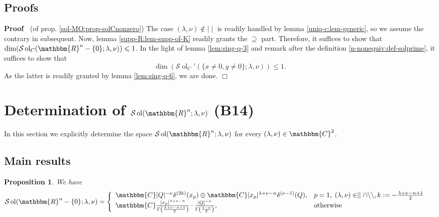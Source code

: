 \documentclass{article}
\newcommand{\nin}{\not\in}
\newcommand{\tmop}[1]{\ensuremath{\operatorname{#1}}}
\renewenvironment{proof}{\noindent\textbf{Proof\ }}{\hspace*{\fill}$\Box$\medskip}
\newtheorem{proposition}{Proposition}[section]
\theoremstyle{remark}
\begin{document}
\subsection{Proofs}

\begin{proof}
  (of prop. \ref{sol-MO:prop-solCnonzero}) The case $(\lambda, \nu) \nin \mid
  \mid$ is readily handled by lemma \ref{uniq-c:lem-generic}, so we assume the
  contrary in subsequent. Now, lemma \ref{supp-R:lem-supp-of-K} readily grants
  the $\supseteq$ part. Therefore, it suffices to show that $\dim (\mathcal{S}
  \tmop{ol}_C (\mathbbm{R}^n - \{ 0 \} ; \lambda, \nu)) \leqslant 1$. In the
  light of lemma \ref{lem:sing-q-3} and remark after the definition
  \ref{n-nonequiv:def-solprime}, it suffices to show that
  \[ \dim (\mathcal{S} \tmop{ol}_C' (\{ x \neq 0, y \neq 0 \} ; \lambda,
     \nu)) \leqslant 1. \]
  As the latter is readily granted by lemma \ref{lem:sing-q-6}, we are done.
\end{proof}

\section{Determination of $\mathcal{S} \tmop{ol} (\mathbbm{R}^n ; \lambda,\nu)$ (B14)}\label{sec:sol-MO}


In this section we explicitly determine the space $\mathcal{S} \tmop{ol}
(\mathbbm{R}^n ; \lambda, \nu)$ for every $(\lambda, \nu) \in \mathbbm{C}^2$.

\subsection{Main results}

\begin{proposition}
  \label{sol-MO:prop-solonnonzero}We have
  \begin{eqnarray}
    & \mathcal{S} \tmop{ol} (\mathbbm{R}^n - \{ 0 \} ; \lambda, \nu) =
    \left\{ \begin{array}{ll}
      \mathbbm{C} | Q |^{- \nu} \delta^{(2 k)} (x_p) \oplus \mathbbm{C} | x_p
      |^{\lambda + \nu - n} \delta^{(\nu - 1)} (Q), & p = 1, \; (\lambda, \nu)
      \in \mid \mid \cap \backslash\backslash, k : = - \frac{\lambda + \nu - n
      + 1}{2}\\
      \mathbbm{C} \frac{| x_p |^{\lambda + \nu - n}}{\Gamma \left(
      \frac{\lambda + \nu - n + 1}{2} \right)} \cdot \frac{| Q |^{-
      \nu}}{\Gamma \left( \frac{1 - \nu}{2} \right)}, & \tmop{otherwise}
    \end{array} \right. &  \nonumber
  \end{eqnarray}
\end{proposition}
\end{document}

